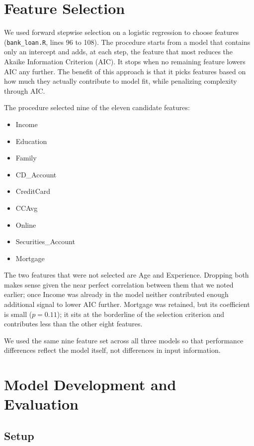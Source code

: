 \documentclass[11pt, a4paper]{article}
\begin{document}
\section{Feature Selection}

We used forward stepwise selection on a logistic regression to choose
features (\texttt{bank\_loan.R}, lines 96 to 108). The procedure starts
from a model that contains only an intercept and adds, at each step, the
feature that most reduces the Akaike Information Criterion (AIC). It stops
when no remaining feature lowers AIC any further. The benefit of this
approach is that it picks features based on how much they actually
contribute to model fit, while penalizing complexity through AIC.

The procedure selected nine of the eleven candidate features:

\begin{itemize}[itemsep=2pt]
    \item Income
    \item Education
    \item Family
    \item CD\_Account
    \item CreditCard
    \item CCAvg
    \item Online
    \item Securities\_Account
    \item Mortgage
\end{itemize}

The two features that were not selected are Age and Experience. Dropping
both makes sense given the near perfect correlation between them that we
noted earlier; once Income was already in the model neither contributed
enough additional signal to lower AIC further. Mortgage was retained, but
its coefficient is small ($p = 0.11$); it sits at the borderline of the
selection criterion and contributes less than the other eight features.

We used the same nine feature set across all three models so that
performance differences reflect the model itself, not differences in input
information.

\section{Model Development and Evaluation}
\label{sec:models}

\subsection{Setup}
\end{document}
